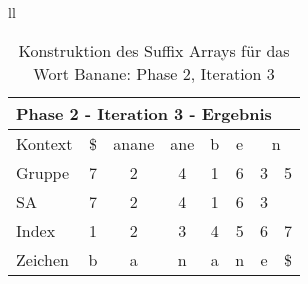\begin{table}[H]
\begin{adjustbox}{max width=\textwidth}
\begin{tabular}{ll}
\begin{tabular}{lccccccc}
\multicolumn{8}{l}{Phase 2 - Iteration 3 - Ergebnis}                                                                                                                                             \\ \hline
\multicolumn{1}{l|}{Kontext} & \multicolumn{1}{c|}{\$} & \multicolumn{1}{c|}{anane} & \multicolumn{1}{c|}{ane} & \multicolumn{1}{c|}{b} & \multicolumn{1}{c|}{e} & \multicolumn{2}{c}{n}         \\
\multicolumn{1}{l|}{Gruppe}  & \multicolumn{1}{c|}{7}  & \multicolumn{1}{c|}{2}     & \multicolumn{1}{c|}{4}   & \multicolumn{1}{c|}{1} & \multicolumn{1}{c|}{6} & 3                         & 5  \\ 
\multicolumn{1}{l|}{SA}      & \multicolumn{1}{c|}{7}  & \multicolumn{1}{c|}{2}     & \multicolumn{1}{c|}{4}   & \multicolumn{1}{c|}{1} & \multicolumn{1}{c|}{6} & \cellcolor[HTML]{\yellow}3 &    \\ \hline
\multicolumn{1}{l|}{Index}   & 1                       & 2                          & 3                        & 4                      & 5                      & 6                         & 7  \\
\multicolumn{1}{l|}{Zeichen} & b                       & a                          & n                        & a                      & n                      & e                         & \$
\end{tabular}

\end{tabular}
\end{adjustbox}

\caption[Konstruktion des Suffix Arrays f{\"u}r das Wort Banane: Phase 2, Iteration 3]{Konstruktion des Suffix Arrays f{\"u}r das Wort Banane: Phase 2, Iteration 3}
\label{fig_banane_2_3} 
\end{table}
